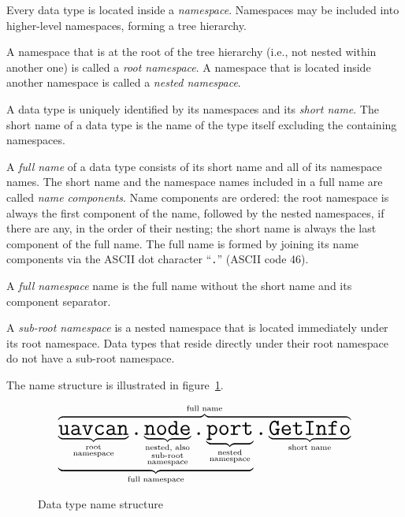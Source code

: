 Every data type is located inside a \emph{namespace}.
Namespaces may be included into higher-level namespaces, forming a tree hierarchy.

A namespace that is at the root of the tree hierarchy (i.e., not nested within another one)
is called a \emph{root namespace}.
A namespace that is located inside another namespace is called a \emph{nested namespace}.

A data type is uniquely identified by its namespaces and its \emph{short name}.
The short name of a data type is the name of the type itself excluding the containing namespaces.

A \emph{full name} of a data type consists of its short name and all of its namespace names.
The short name and the namespace names included in a full name are called \emph{name components}.
Name components are ordered: the root namespace is always the first component of the name,
followed by the nested namespaces, if there are any, in the order of their nesting;
the short name is always the last component of the full name.
The full name is formed by joining its name components via the ASCII dot character ``\verb|.|'' (ASCII code 46).

A \emph{full namespace} name is the full name without the short name and its component separator.

A \emph{sub-root namespace} is a nested namespace that is located immediately under its root namespace.
Data types that reside directly under their root namespace do not have a sub-root namespace.

The name structure is illustrated in figure~\ref{fig:dsdl_data_type_name_structure}.

\begin{figure}[H]
    $$
    \overbrace{
        \underbrace{
            \underbrace{\texttt{\huge{uavcan}}}_{\substack{\text{root} \\ \text{namespace}}}%
            \texttt{\huge{.}}%
            \underbrace{\texttt{\huge{node}}}_{\substack{\text{nested, also} \\ \text{sub-root} \\ \text{namespace}}}%
            \texttt{\huge{.}}%
            \underbrace{\texttt{\huge{port}}}_{\substack{\text{nested} \\ \text{namespace}}}%
        }_{\text{full namespace}}%
        \texttt{\huge{.}}%
        \underbrace{\texttt{\huge{GetInfo}}}_{\text{short name}}
    }^{\text{full name}}
    $$
    \caption{Data type name structure\label{fig:dsdl_data_type_name_structure}}
\end{figure}

